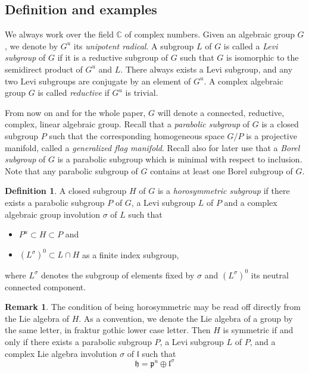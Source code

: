 \documentclass{amsart}
\theoremstyle{definition}
\newtheorem{defn}[thm]{Definition}
\newtheorem{rem}[thm]{Remark}
\begin{document}
\subsection{Definition and examples}

We always work over the field $\mathbb{C}$ of complex numbers.
Given an algebraic group $G$, we denote by $G^u$ its \emph{unipotent radical}. 
A subgroup $L$ of $G$ is called a \emph{Levi subgroup} of $G$ if it is a reductive 
subgroup of $G$ such that $G$ is isomorphic to the semidirect product 
of $G^u$ and $L$. 
There always exists a Levi subgroup, 
and any two Levi subgroups are conjugate by an element of $G^u$. 
A complex algebraic group $G$ is called \emph{reductive} if $G^u$ is trivial.

From now on and for the whole paper, 
$G$ will denote a connected, reductive, complex, linear algebraic group. 
Recall that a \emph{parabolic subgroup} of $G$ is a closed subgroup $P$ such that 
the corresponding homogeneous space $G/P$ is a projective manifold, called 
a \emph{generalized flag manifold}. Recall also for later use that 
a \emph{Borel subgroup} of $G$ is a parabolic subgroup which is minimal 
with respect to inclusion. Note that any parabolic subgroup of $G$ contains 
at least one Borel subgroup of $G$.

\begin{defn}
A closed subgroup $H$ of $G$ is a \emph{horosymmetric subgroup} if there 
exists a parabolic subgroup $P$ of $G$, a Levi subgroup $L$ of $P$ and 
a complex algebraic group involution $\sigma$ of $L$ such that 
\begin{itemize}
\item $P^u\subset  H\subset P$ and
\item $(L^{\sigma})^0\subset L\cap H$ as a finite index subgroup, 
\end{itemize}
where $L^{\sigma}$ denotes the subgroup of elements fixed by $\sigma$ 
and $(L^{\sigma})^0$ its neutral connected component. 
\end{defn}

\begin{rem}
The condition of being horosymmetric may be read off directly from the Lie algebra 
of $H$. As a convention, we denote the Lie algebra of a group by 
the same letter, in fraktur gothic lower case letter.
Then $H$ is symmetric if and only if there exists a parabolic subgroup $P$,
a Levi subgroup $L$ of $P$, and a complex Lie algebra involution 
$\sigma$ of $\mathfrak{l}$ such that 
\[
\mathfrak{h}=\mathfrak{p}^u\oplus \mathfrak{l}^{\sigma}
\]
\end{rem}
\end{document}
